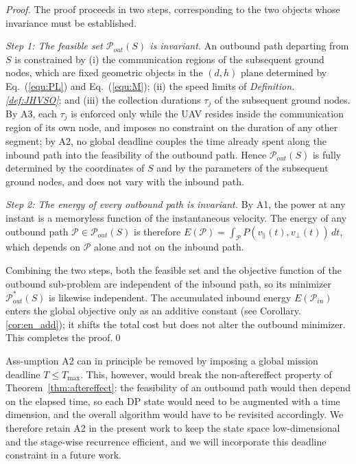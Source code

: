 \begin{proof}
    The proof proceeds in two steps, corresponding to the two objects whose invariance must be established.

    \textit{Step 1: The feasible set $\mathcal{P}_{out}(S)$ is invariant.}
    An outbound path departing from $S$ is constrained by (i) the communication regions of the subsequent ground nodes, which are fixed geometric objects in the $(d,h)$ plane determined by Eq.~(\ref{equ:PL}) and Eq.~(\ref{equ:M}); (ii) the speed limits of \textit{Definition. \ref{def:JHVSO}}; and (iii) the collection durations $\tau_j$ of the subsequent ground nodes.
    By A3, each $\tau_j$ is enforced only while the UAV resides inside the communication region of its own node, and imposes no constraint on the duration of any other segment; by A2, no global deadline couples the time already spent along the inbound path into the feasibility of the outbound path.
    Hence $\mathcal{P}_{out}(S)$ is fully determined by the coordinates of $S$ and by the parameters of the subsequent ground nodes, and does not vary with the inbound path.

    \textit{Step 2: The energy of every outbound path is invariant.}
    By A1, the power at any instant is a memoryless function of the  instantaneous velocity.
    The energy of any outbound path $\mathcal{P} \in \mathcal{P}_{out}(S)$ is therefore $E(\mathcal{P}) = \int_{\mathcal{P}} P(v_{\parallel}(t), v_{\perp}(t))\,dt$, which depends on $\mathcal{P}$ alone and not on the inbound path.

    Combining the two steps, both the feasible set and the objective function of the outbound sub-problem are independent of the inbound path, so its minimizer $\mathcal{P}^{*}_{out}(S)$ is likewise independent.
    The accumulated inbound energy $E(\mathcal{P}_{in})$ enters the global objective only as an additive constant (see Corollary. \ref{cor:en_add}); it shifts the total cost but does not alter the outbound minimizer.
    This completes the proof.\qed
\end{proof}

\begin{remark}
\label{rem:deadline}
    Ass-umption A2 can in principle be removed by imposing a global mission deadline $T \le T_{\max}$. This, however, would break the non-aftereffect property of Theorem~\ref{thm:aftereffect}: the feasibility of an outbound path would then depend on the elapsed time, so each DP state would need to be augmented with a time dimension, and the overall algorithm would have to be revisited accordingly. We therefore retain A2 in the present work to keep the state space low-dimensional and the stage-wise recurrence efficient, and we will incorporate this deadline constraint in a future work.
\end{remark}

